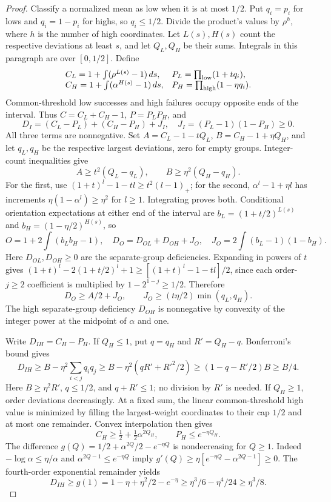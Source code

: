 \begin{proof}
Classify a normalized mean as low when it is at most $1/2$. Put $q_i=p_i$
for lows and $q_i=1-p_i$ for highs, so $q_i\le1/2$. Divide the product's
values by $\rho^h$, where $h$ is the number of high coordinates.
Let $L(s),H(s)$ count the respective deviations at least $s$, and let
$Q_L,Q_H$ be their sums. Integrals in this paragraph are over $[0,1/2]$.
Define
\[
 \begin{array}{ll}
 C_L=1+\int(\rho^{L(s)}-1)\,ds,&P_L=\prod_{\rm low}(1+tq_i),\\
 C_H=1+\int(\alpha^{H(s)}-1)\,ds,&P_H=\prod_{\rm high}(1-\eta q_i).
 \end{array}
\]
Common-threshold low successes and high failures occupy opposite ends
of the interval. Thus $C=C_L+C_H-1$, $P=P_LP_H$, and
\begin{equation}\label{eq:coarse-components}
 D_I=(C_L-P_L)+(C_H-P_H)+J_I,
 \quad J_I=(P_L-1)(1-P_H)\ge0.
\end{equation}
All three terms are nonnegative. Set
$A=C_L-1-tQ_L$, $B=C_H-1+\eta Q_H$, and let $q_L,q_H$ be the respective
largest deviations, zero for empty groups. Integer-count inequalities give
\begin{equation}\label{eq:dispersion-coarse}
 A\ge t^2(Q_L-q_L),\qquad B\ge\eta^2(Q_H-q_H).
\end{equation}
For the first, use $(1+t)^l-1-tl\ge t^2(l-1)_+$; for the second,
$\alpha^l-1+\eta l$ has increments $\eta(1-\alpha^l)\ge\eta^2$
for $l\ge1$. Integrating proves both.
Conditional orientation expectations at either end of the interval are
$b_L=(1+t/2)^{L(s)}$ and $b_H=(1-\eta/2)^{H(s)}$, so
\[
 O=1+2\int(b_Lb_H-1),\quad
 D_O=D_{OL}+D_{OH}+J_O,\quad J_O=2\int(b_L-1)(1-b_H).
\]
Here $D_{OL},D_{OH}\ge0$ are the separate-group deficiencies.
Expanding in powers of $t$ gives
$(1+t)^l-2(1+t/2)^l+1\ge[(1+t)^l-1-tl]/2$, since each order-$j\ge2$
coefficient is multiplied by $1-2^{1-j}\ge1/2$. Therefore
\begin{equation}\label{eq:orientation-coarse}
 D_O\ge A/2+J_O,\qquad J_O\ge(t\eta/2)\min(q_L,q_H).
\end{equation}
The high separate-group deficiency $D_{OH}$ is nonnegative by
convexity of the integer power at the midpoint of $\alpha$ and one.

Write $D_{IH}=C_H-P_H$. If $Q_H\le1$, put $q=q_H$ and $R'=Q_H-q$.
Bonferroni's bound gives
\[
 D_{IH}\ge B-\eta^2\sum_{i<j}q_iq_j
 \ge B-\eta^2(qR'+R'^2/2)
 \ge(1-q-R'/2)B\ge B/4.
\]
Here $B\ge\eta^2R'$, $q\le1/2$, and $q+R'\le1$; no division by
$R'$ is needed. If $Q_H\ge1$, order deviations decreasingly.
At a fixed sum, the linear common-threshold high value is minimized
by filling the largest-weight coordinates to their cap $1/2$ and at
most one remainder. Convex interpolation then gives
\[
 C_H\ge\tfrac12+\tfrac12\alpha^{2Q_H},\qquad P_H\le e^{-\eta Q_H}.
\]
The difference $g(Q)=1/2+\alpha^{2Q}/2-e^{-\eta Q}$ is nondecreasing
for $Q\ge1$. Indeed $-\log\alpha\le\eta/\alpha$ and
$\alpha^{2Q-1}\le e^{-\eta Q}$ imply
$g'(Q)\ge\eta[e^{-\eta Q}-\alpha^{2Q-1}]\ge0$.
The fourth-order exponential remainder yields
\[
 D_{IH}\ge g(1)=1-\eta+\eta^2/2-e^{-\eta}
 \ge\eta^3/6-\eta^4/24\ge\eta^3/8.
\]


\end{proof}
